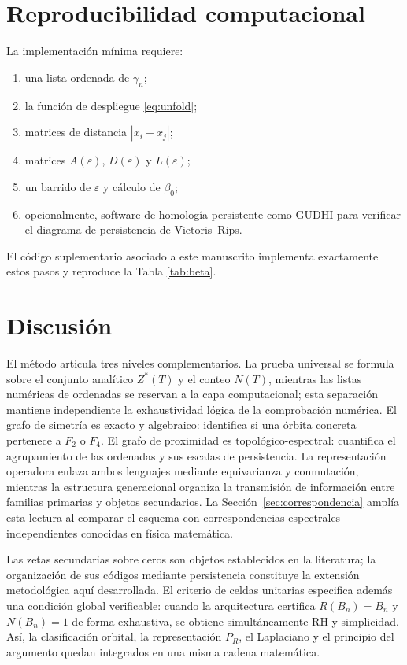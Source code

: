 \documentclass[11pt]{amsart}
\theoremstyle{definition}
\theoremstyle{remark}
\begin{document}
\section{Reproducibilidad computacional}
La implementación mínima requiere:
\begin{enumerate}
\item una lista ordenada de $\gamma_n$;
\item la función de despliegue \eqref{eq:unfold};
\item matrices de distancia $|x_i-x_j|$;
\item matrices $A(\varepsilon)$, $D(\varepsilon)$ y $L(\varepsilon)$;
\item un barrido de $\varepsilon$ y cálculo de $\beta_0$;
\item opcionalmente, software de homología persistente como GUDHI para verificar el diagrama de persistencia de Vietoris--Rips.
\end{enumerate}
El código suplementario asociado a este manuscrito implementa exactamente estos pasos y reproduce la Tabla \ref{tab:beta}.

\section{Discusión}
El método articula tres niveles complementarios. La prueba universal se formula sobre el conjunto analítico $Z^*(T)$ y el conteo $N(T)$, mientras las listas numéricas de ordenadas se reservan a la capa computacional; esta separación mantiene independiente la exhaustividad lógica de la comprobación numérica. El grafo de simetría es exacto y algebraico: identifica si una órbita concreta pertenece a $F_2$ o $F_4$. El grafo de proximidad es topológico-espectral: cuantifica el agrupamiento de las ordenadas y sus escalas de persistencia. La representación operadora enlaza ambos lenguajes mediante equivarianza y conmutación, mientras la estructura generacional organiza la transmisión de información entre familias primarias y objetos secundarios. La Sección~\ref{sec:correspondencia} amplía esta lectura al comparar el esquema con correspondencias espectrales independientes conocidas en física matemática.

Las zetas secundarias sobre ceros son objetos establecidos en la literatura; la organización de sus códigos mediante persistencia constituye la extensión metodológica aquí desarrollada. El criterio de celdas unitarias especifica además una condición global verificable: cuando la arquitectura certifica $R(B_n)=B_n$ y $N(B_n)=1$ de forma exhaustiva, se obtiene simultáneamente RH y simplicidad. Así, la clasificación orbital, la representación $P_R$, el Laplaciano y el principio del argumento quedan integrados en una misma cadena matemática.
\end{document}
